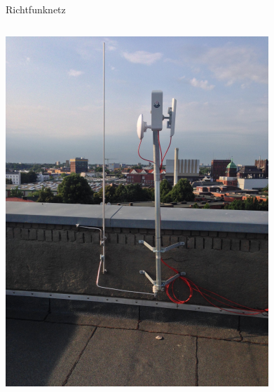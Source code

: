 \documentclass[t]{beamer}
\begin{document}
\begin{frame}{Richtfunknetz}
\begin{columns}
\begin{column}{0.25\textwidth}
\begin{center}
          \includegraphics[width=\textwidth]{images/hamburg-richtfunkmast}
        \end{center}
      \end{column}
    \end{columns}
  \end{frame}
\end{document}
